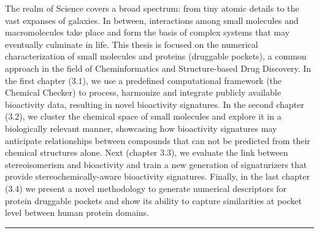 \begin{Figure_modified}
{    The realm of Science covers a broad spectrum: from tiny atomic details to the vast expanses of galaxies. In between, interactions among small molecules and macromolecules take place and form the basis of complex systems that may eventually culminate in life. This thesis is focused on the numerical characterization of small molecules and proteins (druggable pockets), a common approach in the field of Cheminformatics and Structure-based Drug Discovery. In the first chapter (3.1), we use a predefined computational framework (the Chemical Checker) to process, harmonize and integrate publicly available bioactivity data, resulting in novel bioactivity signatures. In the second chapter (3.2), we cluster the chemical space of small molecules and explore it in a biologically relevant manner, showcasing how bioactivity signatures may anticipate relationships between compounds that can not be predicted from their chemical structures alone. Next (chapter 3.3), we evaluate the link between stereoisomerism and bioactivity and train a new generation of signaturizers that provide stereochemically-aware bioactivity signatures. Finally, in the last chapter (3.4) we present a novel methodology to generate numerical descriptors for protein druggable pockets and show its ability to capture similarities at pocket level between human protein domains.
  }
  \vspace{-5mm}
  \rule[0ex]{\textwidth}{0.5pt}
  \vspace{-9mm}
  \label{Introduction_Fig4}
\end{Figure_modified}


